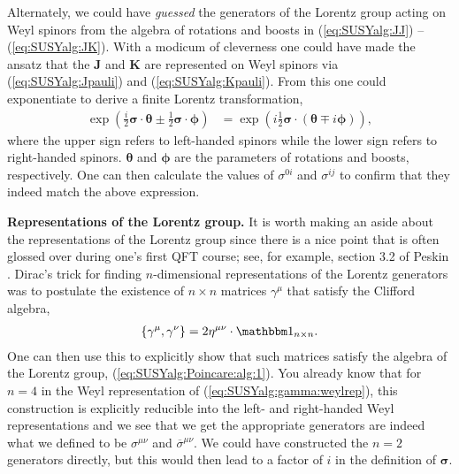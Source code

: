 \documentclass[12pt]{article}
\numberwithin{equation}{section}    %
\renewcommand{\vec}[1]{\mathbf{#1}} %
\begin{document}
Alternately, we could have \textit{guessed} the generators of the Lorentz group acting on Weyl spinors from the algebra of rotations and boosts in (\ref{eq:SUSYalg:JJ}) -- (\ref{eq:SUSYalg:JK}). With a modicum of cleverness one could have made the ansatz that the $\mathbf J$ and $\mathbf K$ are represented on Weyl spinors via (\ref{eq:SUSYalg:Jpauli}) and (\ref{eq:SUSYalg:Kpauli}). From this one could exponentiate to derive a finite Lorentz transformation,
\begin{align}
	\exp\left({\frac i2 \vec\sigma\cdot\vec\theta \pm \frac 12 \vec\sigma\cdot\vec\phi}\right) &= \exp\left({i\frac 12 \vec\sigma\cdot(\vec\theta \mp i\vec\phi)}\right),
\end{align}
where the upper sign refers to left-handed spinors while the lower sign refers to right-handed spinors. $\vec \theta$ and $\vec \phi$ are the parameters of rotations and boosts, respectively. One can then calculate the values of $\sigma^{0i}$ and $\sigma^{ij}$ to confirm that they indeed match the above expression.

\vspace{.5em}
\begin{framed}
	\noindent\textbf{Representations of the Lorentz group.} %
	It is worth making an aside about the representations of the Lorentz group since there is a nice point that is often glossed over during one's first QFT course; see, for example, section 3.2 of Peskin \cite{Peskin:1995ev}. Dirac's trick for finding $n$-dimensional representations of the Lorentz generators was to postulate the existence of $n\times n$ matrices $\gamma^\mu$ that satisfy the Clifford algebra,
	\begin{align}
		\{\gamma^\mu,\gamma^\nu\} = 2\eta^{\mu\nu}\cdot\mathbbm 1_{n\times n}.
	\end{align}
One can then use this to explicitly show that such matrices satisfy the algebra of the Lorentz group,  (\ref{eq:SUSYalg:Poincare:alg:1}). You already know that for $n=4$ in the Weyl representation of  (\ref{eq:SUSYalg:gamma:weylrep}), this construction is explicitly reducible into the left- and right-handed Weyl representations and we see that we get the appropriate generators are indeed what we defined to be $\sigma^{\mu\nu}$ and $\overline\sigma^{\mu\nu}$. We could have constructed the $n=2$ generators directly, but this would then lead to a factor of $i$ in the definition of $\vec\sigma$. 
\end{framed}
\vspace{.5em}
\end{document}
